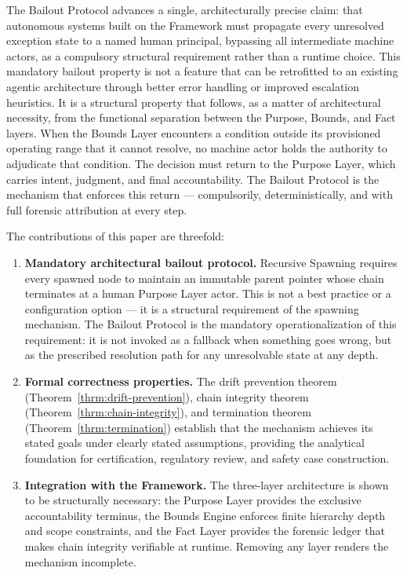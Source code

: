 The Bailout Protocol advances a single, architecturally precise claim: that autonomous systems built on the \bxthree{} Framework must propagate every unresolved exception state to a named human principal, bypassing all intermediate machine actors, as a compulsory structural requirement rather than a runtime choice. This mandatory bailout property is not a feature that can be retrofitted to an existing agentic architecture through better error handling or improved escalation heuristics. It is a structural property that follows, as a matter of architectural necessity, from the functional separation between the Purpose, Bounds, and Fact layers. When the Bounds Layer encounters a condition outside its provisioned operating range that it cannot resolve, no machine actor holds the authority to adjudicate that condition. The decision must return to the Purpose Layer, which carries intent, judgment, and final accountability. The Bailout Protocol is the mechanism that enforces this return --- compulsorily, deterministically, and with full forensic attribution at every step.

The contributions of this paper are threefold:

\begin{enumerate}
    \itemsep0em
    \item \textbf{Mandatory architectural bailout protocol.} Recursive Spawning requires every spawned node to maintain an immutable parent pointer whose chain terminates at a human Purpose Layer actor. This is not a best practice or a configuration option --- it is a structural requirement of the spawning mechanism. The Bailout Protocol is the mandatory operationalization of this requirement: it is not invoked as a fallback when something goes wrong, but as the prescribed resolution path for any unresolvable state at any depth.

    \item \textbf{Formal correctness properties.} The drift prevention theorem (Theorem~\ref{thrm:drift-prevention}), chain integrity theorem (Theorem~\ref{thrm:chain-integrity}), and termination theorem (Theorem~\ref{thrm:termination}) establish that the mechanism achieves its stated goals under clearly stated assumptions, providing the analytical foundation for certification, regulatory review, and safety case construction.

    \item \textbf{Integration with the \bxthree{} Framework.} The three-layer architecture is shown to be structurally necessary: the Purpose Layer provides the exclusive accountability terminus, the Bounds Engine enforces finite hierarchy depth and scope constraints, and the Fact Layer provides the forensic ledger that makes chain integrity verifiable at runtime. Removing any layer renders the mechanism incomplete.
\end{enumerate}

